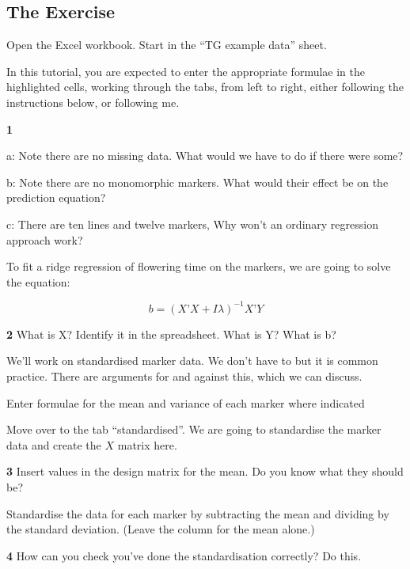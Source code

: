 \documentclass[
]{book}
\makeatletter
\newenvironment{kframe}{%
\medskip{}
\setlength{\fboxsep}{.8em}
 \def\at@end@of@kframe{}%
 \ifinner\ifhmode%
  \def\at@end@of@kframe{\end{minipage}}%
  \begin{minipage}{\columnwidth}%
 \fi\fi%
 \def\FrameCommand##1{\hskip\@totalleftmargin \hskip-\fboxsep
 \colorbox{shadecolor}{##1}\hskip-\fboxsep
     \hskip-\linewidth \hskip-\@totalleftmargin \hskip\columnwidth}%
 \MakeFramed {\advance\hsize-\width
   \@totalleftmargin\z@ \linewidth\hsize
   \@setminipage}}%
 {\par\unskip\endMakeFramed%
 \at@end@of@kframe}
\newenvironment{rmdblock}[1]
  {
  \begin{itemize}
  \renewcommand{\labelitemi}{
    \raisebox{-.7\height}[0pt][0pt]{
      {\setkeys{Gin}{width=3em,keepaspectratio}\texttt{[image: images/\#1]}}
    }
  }
  \setlength{\fboxsep}{1em}
  \begin{kframe}
  \item
  }
  {
  \end{kframe}
  \end{itemize}
  }
\newenvironment{rmdquiz}
  {\begin{rmdblock}{quiz}}
  {\end{rmdblock}}
\makeatother
\begin{document}
\hypertarget{the-exercise-5}{%
\subsection{The Exercise}\label{the-exercise-5}}

Open the Excel workbook. Start in the ``TG example data'' sheet.

In this tutorial, you are expected to enter the appropriate formulae in the highlighted cells, working through the tabs, from left to right, either following the instructions below, or following me.

\begin{rmdquiz}
\textbf{1}

a: Note there are no missing data. What would we have to do if there were some?

b: Note there are no monomorphic markers. What would their effect be on the prediction equation?

c: There are ten lines and twelve markers, Why won't an ordinary regression approach work?
\end{rmdquiz}

To fit a ridge regression of flowering time on the markers, we are going to solve the equation:

\[b = (X’X+Iλ)^{-1} X’Y\]

\begin{rmdquiz}
\textbf{2} What is X? Identify it in the spreadsheet. What is Y? What is b?
\end{rmdquiz}

We'll work on standardised marker data. We don't have to but it is common practice. There are arguments for and against this, which we can discuss.

Enter formulae for the mean and variance of each marker where indicated

Move over to the tab ``standardised''. We are going to standardise the marker data and create the \(X\) matrix here.

\begin{rmdquiz}
\textbf{3}
Insert values in the design matrix for the mean. Do you know what they should be?
\end{rmdquiz}

Standardise the data for each marker by subtracting the mean and dividing by the standard deviation. (Leave the column for the mean alone.)

\begin{rmdquiz}
\textbf{4}
How can you check you've done the standardisation correctly? Do this.
\end{rmdquiz}
\end{document}
